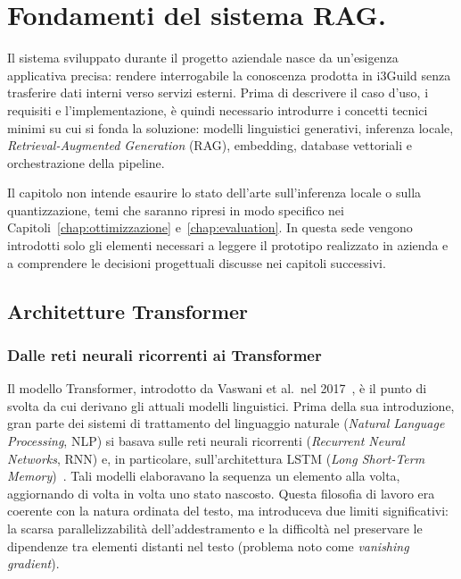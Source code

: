 \pagestyle{mystyle}
\chapter{Fondamenti del sistema RAG.}
\label{chap:background}

Il sistema sviluppato durante il progetto aziendale nasce da un'esigenza
applicativa precisa: rendere interrogabile la conoscenza prodotta in i3Guild
senza trasferire dati interni verso servizi esterni. Prima di descrivere il caso
d'uso, i requisiti e l'implementazione, è quindi necessario introdurre i
concetti tecnici minimi su cui si fonda la soluzione: modelli linguistici
generativi, inferenza locale, \textit{Retrieval-Augmented Generation} (RAG),
embedding, database vettoriali e orchestrazione della pipeline.

Il capitolo non intende esaurire lo stato dell'arte sull'inferenza locale o
sulla quantizzazione, temi che saranno ripresi in modo specifico nei
Capitoli~\ref{chap:ottimizzazione} e~\ref{chap:evaluation}. In questa sede
vengono introdotti solo gli elementi necessari a leggere il prototipo
realizzato in azienda e a comprendere le decisioni progettuali discusse nei
capitoli successivi.

\section{Architetture Transformer}
\label{sec:transformer}

\subsection{Dalle reti neurali ricorrenti ai Transformer}
Il modello Transformer, introdotto da Vaswani et al.\ nel
2017~\cite{vaswani2017attention}, è il punto di svolta da cui derivano
gli attuali modelli linguistici. Prima della sua introduzione, gran parte dei
sistemi di trattamento del linguaggio naturale (\textit{Natural Language
Processing}, NLP) si basava sulle reti neurali ricorrenti (\textit{Recurrent
Neural Networks}, RNN) e, in particolare, sull'architettura LSTM (\textit{Long
Short-Term Memory})~\cite{hochreiter1997lstm}. Tali modelli elaboravano la
sequenza un elemento alla volta, aggiornando di volta in volta uno stato nascosto.
Questa filosofia di lavoro era coerente con la natura ordinata del testo, ma introduceva
due limiti significativi: la scarsa parallelizzabilità dell'addestramento e la
difficoltà nel preservare le dipendenze tra elementi distanti
nel testo (problema noto come \textit{vanishing gradient}).

